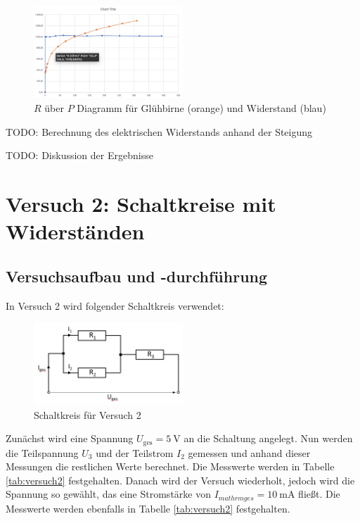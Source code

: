         \begin{figure}[h!]
            \centering
            \includegraphics[width=0.5\textwidth]{bilder/Physik_03.png}
            \caption{$R$ über $P$ Diagramm für Glühbirne (orange) und Widerstand (blau)}
            \label{fig:wertev2}
        \end{figure}

        TODO: Berechnung des elektrischen Widerstands anhand der Steigung

        TODO: Diskussion der Ergebnisse

\section{Versuch 2: Schaltkreise mit Widerständen}

    \subsection{Versuchsaufbau und -durchführung}

        In Versuch 2 wird folgender Schaltkreis verwendet:

        \begin{figure}[h!]
            \centering
            \includegraphics[width=0.5\textwidth]{bilder/Physik_04.png}
            \caption{Schaltkreis für Versuch 2}
            \label{fig:versuch2}
        \end{figure}

        Zunächst wird eine Spannung $U_{\mathrm{ges}} = 5\ \mathrm{V}$ an die Schaltung angelegt. Nun werden die Teilspannung $U_{3}$ und der Teilstrom $I_{2}$ gemessen und anhand dieser Messungen die restlichen Werte berechnet. Die Messwerte werden in Tabelle \ref{tab:versuch2} festgehalten.
        Danach wird der Versuch wiederholt, jedoch wird die Spannung so gewählt, das eine Stromstärke von $I_{mathrm{ges}} = 10\ \mathrm{mA}$ fließt. Die Messwerte werden ebenfalls in Tabelle \ref{tab:versuch2} festgehalten.

